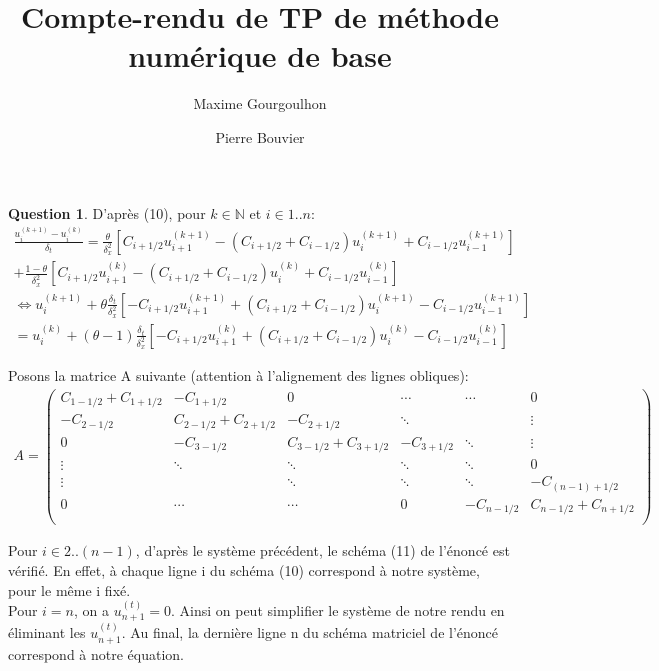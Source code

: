\documentclass[a4paper]{article}
\title{Compte-rendu de TP de méthode numérique de base}
\author{Maxime Gourgoulhon \and Pierre Bouvier}
\theoremstyle{definition}
\newtheorem{que}{Question}
\begin{document}
	\maketitle
	\begin{que}
		D'après (10), pour $k \in \mathbb{N}$ et $i \in 1..n$:
		\begin{align*}
			\frac{u_i^{(k+1)} - u_i^{(k)}}{\delta_t} = \frac{\theta}{\delta_x^2} [C_{i+1/2}u_{i+1}^{(k+1)} - (C_{i+1/2} + C_{i-1/2})u_{i}^{(k+1)} + C_{i-1/2}u_{i-1}^{(k+1)}]
\\ + \frac{1-\theta}{\delta_x^2} [C_{i+1/2}u_{i+1}^{(k)} - (C_{i+1/2} + C_{i-1/2})u_{i}^{(k)} + C_{i-1/2}u_{i-1}^{(k)}]
		  \\ \Leftrightarrow u_i^{(k+1)} + \theta\frac{\delta_t}{\delta_x^2} [-C_{i+1/2}u_{i+1}^{(k+1)} + (C_{i+1/2} + C_{i-1/2})u_{i}^{(k+1)} - C_{i-1/2}u_{i-1}^{(k+1)}] \\ =  u_i^{(k)}
 + (\theta-1)\frac{\delta_t}{\delta_x^2}[-C_{i+1/2}u_{i+1}^{(k)} + (C_{i+1/2} + C_{i-1/2})u_{i}^{(k)} - C_{i-1/2}u_{i-1}^{(k)}]
		\end{align*}

		Posons la matrice A suivante (attention à l'alignement des lignes obliques):
		\begin{align*}
			A=
			\begin{pmatrix}
				C_{1-1/2} + C_{1+1/2} & - C_{1+1/2}  & 0 & \cdots & \cdots & 0 \\
				 - C_{2-1/2} & C_{2-1/2} + C_{2+1/2} & - C_{2+1/2}  & \ddots & ~ & \vdots\\
				0 & - C_{3-1/2} & C_{3-1/2} + C_{3+1/2} & - C_{3+1/2}  & \ddots & \vdots\\
				\vdots & \ddots & \ddots & \ddots & \ddots & 0\\
				\vdots & ~ & \ddots & \ddots & \ddots & - C_{(n-1)+1/2}\\
				0 & \cdots & \cdots & 0 & - C_{n-1/2} & C_{n-1/2} + C_{n+1/2} \\
			\end{pmatrix}
		\end{align*}

		Pour $i \in 2..(n-1)$, d'après le système précédent, le schéma (11) de l'énoncé est vérifié.
		En effet, à chaque ligne i du schéma (10) correspond à notre système, pour le même i fixé.\\

		Pour $i = n$, on a $u_{n+1}^{(t)} = 0$. Ainsi on peut simplifier le système de notre rendu en éliminant les $u_{n+1}^{(t)}$.
		Au final, la dernière ligne n du schéma matriciel de l'énoncé correspond à notre équation. \\


\end{que}
\end{document}

